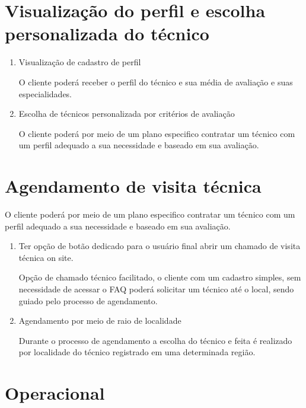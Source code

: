 \documentclass[
    12pt,               %
    openright,          %
    oneside,
    a4paper,            %
    english,            %
    brazil              %
   ]{ifsp-spo-inf-ctds}
\begin{document}
\section{Visualização do perfil e escolha personalizada do técnico}

	\begin{enumerate}
		
		\item
		Visualização de cadastro de perfil
		
		O cliente poderá receber o perfil do técnico e sua média de avaliação e suas especialidades.
		
		\item
		Escolha de técnicos personalizada por critérios de avaliação
		
		O cliente poderá por meio de um plano especifico contratar um técnico com um perfil adequado a sua necessidade e baseado em sua avaliação.
		
	\end{enumerate}

\section{Agendamento de visita técnica}

	O cliente poderá por meio de um plano especifico contratar um técnico com um perfil adequado a sua necessidade e baseado em sua avaliação.

	\begin{enumerate}
	
	     \item
	     Ter opção de botão dedicado para o usuário final abrir um chamado de visita técnica on site.
	     
	     Opção de chamado técnico facilitado, o cliente com um cadastro simples, sem necessidade de acessar o FAQ poderá solicitar um técnico até o local, sendo guiado pelo processo de agendamento.
	     
	     \item
	     Agendamento por meio de raio de localidade
	     
	     Durante o processo de agendamento a escolha do técnico e feita é realizado por localidade do técnico registrado em uma determinada região.
	        
	\end{enumerate}

\section{Operacional}
\end{document}

